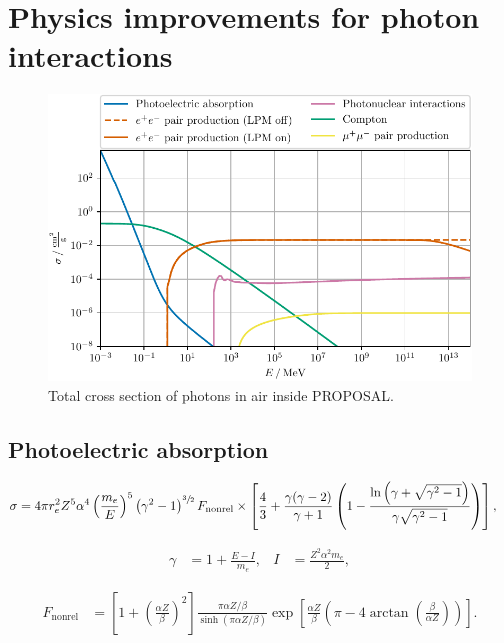 \section{Physics improvements for photon interactions}

\begin{figure}
	\centering
    \includegraphics{plots/Photon_Air_dndx_ecut_0.pdf}
    \caption{Total cross section of photons in air inside PROPOSAL.}
    \label{fig:total_cross_photon}
\end{figure}


\subsection{Photoelectric absorption}

\begin{align}
	\label{eqn:sauter}
	\sigma &= 4 \pi r_e^2 Z^5 \alpha^4 \left( \frac{m_e}{E} \right)^5 \left( \gamma^2 -1 \right)^{\sfrac{3}{2}} F_\text{nonrel} \times \left[ \frac{4}{3} + \frac{\gamma (\gamma - 2)}{\gamma + 1} \left( 1 - \frac{\ln{\left( \gamma + \sqrt{\gamma^2 - 1} \right)}}{\gamma \sqrt{\gamma^2 - 1}}  \right) \right],
\end{align}

\begin{align}
	\gamma &= 1 + \frac{E - I}{m_e}, & I &= \frac{Z^2 \alpha^2 m_e}{2},
\end{align}

\begin{align}
	F_\text{nonrel} &= \left[ 1 + \left( \frac{\alpha Z}{\beta} \right)^2 \right] \frac{\pi \alpha Z / \beta }{\sinh(\pi \alpha Z / \beta )} \exp\left[ \frac{\alpha Z}{\beta} \left( \pi - 4 \arctan\left( \frac{\beta}{\alpha Z} \right) \right) \right].
\end{align}


